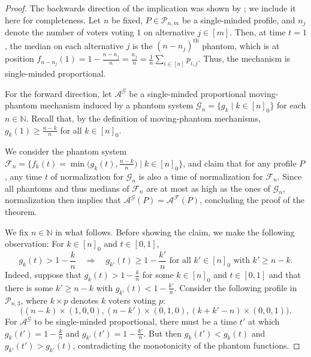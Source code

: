 \documentclass[11pt]{article}
\newcommand{\F}{\mathcal{F}}
\newcommand{\G}{\mathcal{G}}
\newcommand{\A}{\mathcal{A}}
\newcommand{\N}{\mathbb{N}}
\begin{document}
\lemProportionalPhantoms*
\begin{proof}
    The backwards direction of the implication was shown by \citet{freeman2021truthful}; we include it here for completeness. Let $n$ be fixed, $P \in \mathcal{P}_{n,m}$ be a single-minded profile, and $n_j$ denote the number of voters voting $1$ on alternative $j\in [m]$. Then, at time $t = 1$, the median on each alternative $j$ is the $(n-n_j)^\text{th}$ phantom, which is at position $f_{n-n_j}(1) = 1 - \frac{n-n_j}{n} = \frac{n_j}{n} = \frac{1}{n} \sum_{i \in [n]} p_{i,j}$.
    Thus, the mechanism is single-minded proportional.

    For the forward direction, let $\A^\G$ be a single-minded proportional moving-phantom mechanism induced by a phantom system $\G_n = \{g_k \mid k \in [n]_0\}$ for each $n \in \N$. Recall that, by the definition of moving-phantom mechanisms, $g_k(1) \ge \frac{n-k}{n}$ for all $k \in [n]_0$.
    
    We consider the phantom system $\F_n = \big\{f_k(t) = \min\big(g_k(t), \frac{n-k}{n}\big) \mid k \in [n]_0\big\}$, and claim that for any profile $P$, any time $t$ of normalization for $\G_n$ is also a time of normalization for $\F_n$. Since all phantoms and thus medians of $\F_n$ are at most as high as the ones of $\G_n$, normalization then implies that $\A^\G(P) = \A^\F(P)$, concluding the proof of the theorem.

    We fix $n\in \N$ in what follows. Before showing the claim, we make the following observation: For $k\in [n]_0$ and $t\in [0,1]$,
    \begin{equation}
        g_k(t) > 1 - \frac{k}{n} \quad \Longrightarrow \quad g_{k'}(t) \ge 1 - \frac{k'}{n} \text{ for all } k'\in [n]_0 \text{ with } k'\geq n-k.\label{imp:prop-phantoms}
    \end{equation}
    Indeed, suppose that $g_k(t) > 1 - \frac{k}{n}$ for some $k\in [n]_0$ and $t\in [0,1]$ and that there is some $k' \ge n-k$ with $g_{k'}(t) < 1 - \frac{k'}{n}$.
    Consider the following profile in $\mathcal{P}_{n,3}$, where $k \times p$ denotes $k$ voters voting $p$: $$\big( (n-k) \times (1,0,0), (n-k') \times (0,1,0), (k+k'-n) \times (0,0,1) \big).$$
    For $\A^\G$ to be single-minded proportional, there must be a time $t'$ at which $g_k(t') = 1 - \frac{k}{n}$ and $g_{k'}(t') = 1 - \frac{k'}{n}$. But then $g_k(t') < g_k(t)$ and $g_{k'}(t') > g_{k'}(t)$, contradicting the monotonicity of the phantom functions.
    
    


\end{proof}
\end{document}
